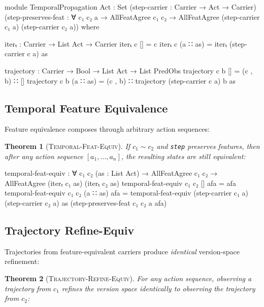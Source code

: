 \documentclass[9pt,a4paper]{article}
\theoremstyle{plain}
\newtheorem{theorem}{Theorem}
\theoremstyle{definition}
\theoremstyle{remark}
\begin{document}
\begin{code}
    module TemporalPropagation
      {Act : Set}
      (step-carrier : Carrier → Act → Carrier)
      (step-preserves-feat : ∀ c₁ c₂ a →
        AllFeatAgree c₁ c₂ →
        AllFeatAgree (step-carrier c₁ a) (step-carrier c₂ a))
      where

      iterₜ : Carrier → List Act → Carrier
      iterₜ c []       = c
      iterₜ c (a ∷ as) = iterₜ (step-carrier c a) as

      trajectory : Carrier → Bool → List Act → List PredObs
      trajectory c b []       = (c , b) ∷ []
      trajectory c b (a ∷ as) = (c , b) ∷ trajectory (step-carrier c a) b as
\end{code}

\subsection{Temporal Feature Equivalence}

Feature equivalence composes through arbitrary action sequences:

\begin{theorem}[\textsc{Temporal-Feat-Equiv}]
If $c_1 \sim c_2$ and \texttt{step} preserves features, then after any action sequence $[a_1, \ldots, a_n]$, the resulting states are still equivalent:
\end{theorem}

\begin{code}
      temporal-feat-equiv : ∀ c₁ c₂ (as : List Act) →
        AllFeatAgree c₁ c₂ →
        AllFeatAgree (iterₜ c₁ as) (iterₜ c₂ as)
      temporal-feat-equiv c₁ c₂ [] afa = afa
      temporal-feat-equiv c₁ c₂ (a ∷ as) afa =
        temporal-feat-equiv
          (step-carrier c₁ a) (step-carrier c₂ a) as
          (step-preserves-feat c₁ c₂ a afa)
\end{code}

\subsection{Trajectory Refine-Equiv}

Trajectories from feature-equivalent carriers produce \emph{identical} version-space refinement:

\begin{theorem}[\textsc{Trajectory-Refine-Equiv}]
For any action sequence, observing a trajectory from $c_1$ refines the version space identically to observing the trajectory from $c_2$:
\end{theorem}
\end{document}
